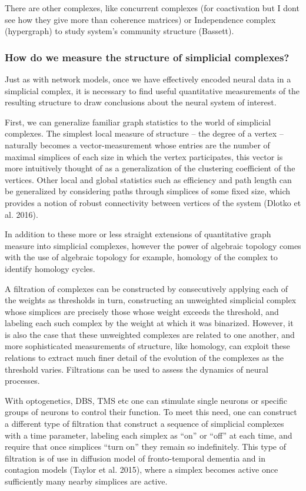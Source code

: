 \documentclass[onecollarge,runningheads]{svjour2}
\begin{document}
There are other complexes, like concurrent complexes (for coactivation but I dont see how they give more than coherence matrices) or Independence complex (hypergraph) to study system’s community structure (Bassett).

\subsubsection{How do we measure the structure of simplicial complexes?}
Just as with network models, once we have effectively encoded neural data in a simplicial complex, it is necessary to find useful quantitative measurements of the resulting structure to draw conclusions about the neural system of interest.

First, we can generalize familiar graph statistics to the world of simplicial complexes. The simplest local measure of structure – the degree of a vertex – naturally becomes a vector-measurement whose entries are the number of maximal simplices of each size in which the vertex participates, this vector is more intuitively thought of as a generalization of the clustering coefficient of the vertices. Other local and global statistics such as efficiency and path length can be generalized by considering paths through simplices of some fixed size, which provides a notion of robust connectivity between vertices of the system (Dlotko et al. 2016).

In addition to these more or less straight extensions of quantitative graph measure into simplicial complexes, however the power of algebraic topology comes with the use of algebraic topology for example, homology of the complex to identify homology cycles.

A filtration of complexes can be constructed by consecutively applying each of the weights as thresholds in turn, constructing an unweighted simplicial complex whose simplices are precisely those whose weight exceeds the threshold, and labeling each such complex by the weight at which it was binarized. However, it is also the case that these unweighted complexes are related to one another, and more sophisticated measurements of structure, like homology, can exploit these relations to extract much finer detail of the evolution of the complexes as the threshold varies.
Filtrations can be used to assess the dynamics of neural processes.

With optogenetics, DBS, TMS etc one can stimulate single neurons or specific groups of neurons to control their function. To meet this need, one can construct a different type of filtration \citep{taylor2015topological} that construct a sequence of simplicial complexes with a time parameter, labeling each simplex as “on” or “off” at each time, and require that once simplices “turn on” they remain so indefinitely. This type of filtration is of use in  diffusion model of fronto-temporal dementia and in contagion models (Taylor et al. 2015), where a simplex becomes active once sufficiently many nearby simplices are active.
\end{document}
